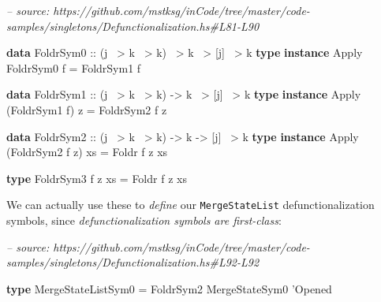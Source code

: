 \documentclass[]{article}
\newenvironment{Shaded}{}{}
\newcommand{\CommentTok}[1]{\textcolor[rgb]{0.38,0.63,0.69}{\textit{#1}}}
\newcommand{\DataTypeTok}[1]{\textcolor[rgb]{0.56,0.13,0.00}{#1}}
\newcommand{\FunctionTok}[1]{\textcolor[rgb]{0.02,0.16,0.49}{#1}}
\newcommand{\KeywordTok}[1]{\textcolor[rgb]{0.00,0.44,0.13}{\textbf{#1}}}
\newcommand{\NormalTok}[1]{#1}
\newcommand{\OtherTok}[1]{\textcolor[rgb]{0.00,0.44,0.13}{#1}}
\begin{document}
\begin{Shaded}
\begin{Highlighting}[]
\CommentTok{-- source: https://github.com/mstksg/inCode/tree/master/code-samples/singletons/Defunctionalization.hs#L81-L90}

\KeywordTok{data} \DataTypeTok{FoldrSym0}\OtherTok{ ::}\NormalTok{ (j }\FunctionTok{~>}\NormalTok{ k }\FunctionTok{~>}\NormalTok{ k) }\FunctionTok{~>}\NormalTok{ k }\FunctionTok{~>}\NormalTok{ [j] }\FunctionTok{~>}\NormalTok{ k}
\KeywordTok{type} \KeywordTok{instance} \DataTypeTok{Apply} \DataTypeTok{FoldrSym0}\NormalTok{ f }\FunctionTok{=} \DataTypeTok{FoldrSym1}\NormalTok{ f}

\KeywordTok{data} \DataTypeTok{FoldrSym1}\OtherTok{ ::}\NormalTok{ (j }\FunctionTok{~>}\NormalTok{ k }\FunctionTok{~>}\NormalTok{ k) }\OtherTok{->}\NormalTok{ k }\FunctionTok{~>}\NormalTok{ [j] }\FunctionTok{~>}\NormalTok{ k}
\KeywordTok{type} \KeywordTok{instance} \DataTypeTok{Apply}\NormalTok{ (}\DataTypeTok{FoldrSym1}\NormalTok{ f) z }\FunctionTok{=} \DataTypeTok{FoldrSym2}\NormalTok{ f z}

\KeywordTok{data} \DataTypeTok{FoldrSym2}\OtherTok{ ::}\NormalTok{ (j }\FunctionTok{~>}\NormalTok{ k }\FunctionTok{~>}\NormalTok{ k) }\OtherTok{->}\NormalTok{ k }\OtherTok{->}\NormalTok{ [j] }\FunctionTok{~>}\NormalTok{ k}
\KeywordTok{type} \KeywordTok{instance} \DataTypeTok{Apply}\NormalTok{ (}\DataTypeTok{FoldrSym2}\NormalTok{ f z) xs }\FunctionTok{=} \DataTypeTok{Foldr}\NormalTok{ f z xs}

\KeywordTok{type} \DataTypeTok{FoldrSym3}\NormalTok{ f z xs }\FunctionTok{=} \DataTypeTok{Foldr}\NormalTok{ f z xs}
\end{Highlighting}
\end{Shaded}

We can actually use these to \emph{define} our \texttt{MergeStateList}
defunctionalization symbols, since \emph{defunctionalization symbols are
first-class}:

\begin{Shaded}
\begin{Highlighting}[]
\CommentTok{-- source: https://github.com/mstksg/inCode/tree/master/code-samples/singletons/Defunctionalization.hs#L92-L92}

\KeywordTok{type} \DataTypeTok{MergeStateListSym0} \FunctionTok{=} \DataTypeTok{FoldrSym2} \DataTypeTok{MergeStateSym0}\NormalTok{ '}\DataTypeTok{Opened}
\end{Highlighting}
\end{Shaded}
\end{document}
